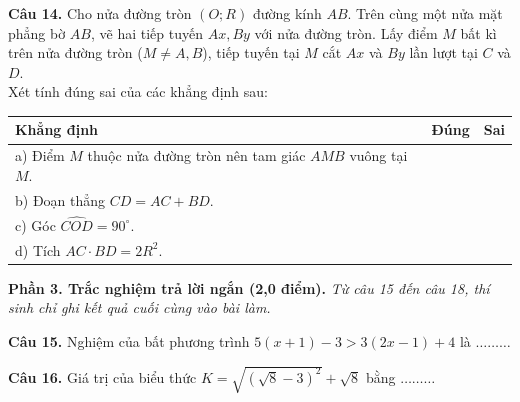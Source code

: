 \documentclass[11pt,a4paper]{article}
\begin{document}
\vspace{2mm}
\textbf{Câu 14.} Cho nửa đường tròn $(O; R)$ đường kính $AB$. Trên cùng một nửa mặt phẳng bờ $AB$, vẽ hai tiếp tuyến $Ax, By$ với nửa đường tròn. Lấy điểm $M$ bất kì trên nửa đường tròn ($M \ne A, B$), tiếp tuyến tại $M$ cắt $Ax$ và $By$ lần lượt tại $C$ và $D$.\\
Xét tính đúng sai của các khẳng định sau:
\begin{center}
\begin{tabularx}{\linewidth}{|X|c|c|}
\hline
\textbf{Khẳng định} & \textbf{Đúng} & \textbf{Sai} \\
\hline
a) Điểm $M$ thuộc nửa đường tròn nên tam giác $AMB$ vuông tại $M$. & & \\
\hline
b) Đoạn thẳng $CD = AC + BD$. & & \\
\hline
c) Góc $\widehat{COD} = 90^\circ$. & & \\
\hline
d) Tích $AC \cdot BD = 2R^2$. & & \\
\hline
\end{tabularx}
\end{center}

\vspace{3mm}
\noindent
\textbf{Phần 3. Trắc nghiệm trả lời ngắn (2,0 điểm).} \textit{Từ câu 15 đến câu 18, thí sinh chỉ ghi kết quả cuối cùng vào bài làm.}

\vspace{1.5mm}
\textbf{Câu 15.} Nghiệm của bất phương trình $5(x + 1) - 3 > 3(2x - 1) + 4$ là $\dots\dots\dots$

\vspace{1.5mm}
\textbf{Câu 16.} Giá trị của biểu thức $K = \sqrt{(\sqrt{8} - 3)^2} + \sqrt{8}$ bằng $\dots\dots\dots$
\end{document}
